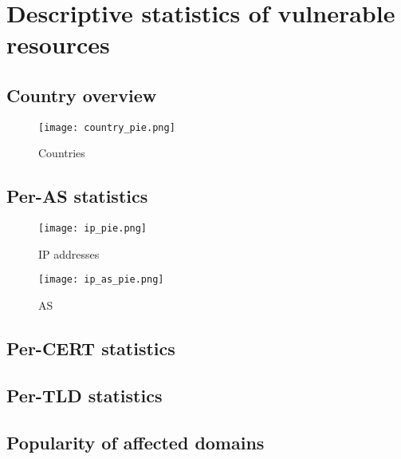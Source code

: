 \section{Descriptive statistics of vulnerable resources}
\subsection{Country overview}
\begin{figure}[!hbt]
\centering
\texttt{[image: country\_pie.png]}
\caption{Countries}
\end{figure}

\subsection{Per-AS statistics}
\begin{figure}[!hbt]
\centering
\texttt{[image: ip\_pie.png]}
\caption{IP addresses}
\end{figure}

\begin{figure}[!hbt]
\centering
\texttt{[image: ip\_as\_pie.png]}
\caption{AS}
\end{figure}

\subsection{Per-CERT statistics}
\subsection{Per-TLD statistics}
\subsection{Popularity of affected domains}
